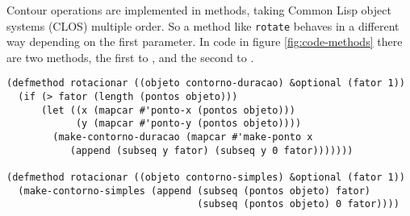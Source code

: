 Contour operations are implemented in methods, taking Common Lisp
object systems (CLOS) multiple order. So a method like \texttt{rotate}
behaves in a different way depending on the first parameter. In code
in figure \ref{fig:code-methods} there are two methods, the first to
, and the second to .

\begin{figure*}
\begin{verbatim}
(defmethod rotacionar ((objeto contorno-duracao) &optional (fator 1))
  (if (> fator (length (pontos objeto)))
      (let ((x (mapcar #'ponto-x (pontos objeto)))
            (y (mapcar #'ponto-y (pontos objeto))))
        (make-contorno-duracao (mapcar #'make-ponto x
           (append (subseq y fator) (subseq y 0 fator)))))))

(defmethod rotacionar ((objeto contorno-simples) &optional (fator 1))
  (make-contorno-simples (append (subseq (pontos objeto) fator)
                                 (subseq (pontos objeto) 0 fator))))
\end{verbatim}
  \caption{Methods}
  \label{fig:code-methods}
\end{figure*}

